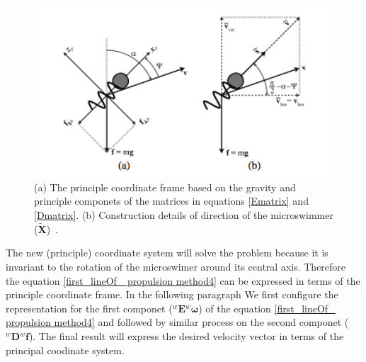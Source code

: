 \documentclass[12pt,a4paper,titlepage]{report}
\begin{document}
\begin{figure}
  \centering
    \includegraphics[width=1.0\textwidth]{horiz_verti_velocity}
  \caption{(a) The principle coordinate frame based on the gravity and principle componets
of the matrices in equations \ref{Ematrix} and \ref{Dmatrix}. (b) Construction details of 
direction of the microswimmer ($\bm{\tilde{X}}$)~\citep{mahoney2011velocity}.}
  \label{horiz_verti_velocity}
\end{figure}

The new (principle) coordinate system will solve the problem because it is invariant to the rotation
 of the microswimer around its central axis. Therefore the equation \ref{first_lineOf_ propulsion method4} can
be expressed in terms of the principle coordinate frame. In the following paragraph
We first configure the representation for the first componet (${^{w}\bm{E}} {^{w}\bm{\omega}}$) of the 
equation \ref{first_lineOf_ propulsion method4} 
 and followed by similar process on the second componet (${^{w}\bm{D}} {^{w}\bm{f}}$). The final result will express the 
desired velocity vector in terms of the principal coodinate system. 
\end{document}
